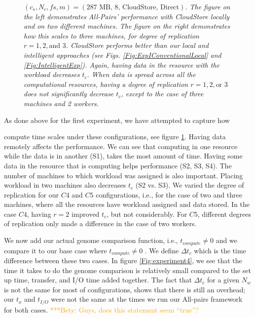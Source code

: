 \documentclass{rspublic}
\newcommand{\micnote}[1]{ {\textcolor{blue} { ***Michael: #1 }}}
\newcommand{\betynote}[1]{ {\textcolor{orange} { ***Bety: #1 }}}
\newcommand{\jhanote}[1]{} \newcommand{\micnote}[1]{}\newcommand{\betynote}[1]{} \newcommand{\fixme}[1]{}
\begin{document}
\begin{figure}
\begin{center}
{\label{Fig:experiment3:b}
}
\caption{\textit{$(c_s, N_c, fs, m) = (\mbox{287 MB, 8, CloudStore,
Direct})$. The figure on the left demonstrates All-Pairs' performance
with CloudStore locally and on two different machines. The figure on the
right demonstrates how this scales to three machines, for degree of
replication $r=1,2,\mbox{and } 3$. CloudStore performs better than our
local and intelligent approaches (see Figs.
\ref{Fig:ExpIConventionalLocal} and \ref{Fig:IntelligentExp}). Again,
having data in the resource with the workload decreases $t_c$. When data
is spread across all the computational resources, having a degree of
replication $r = 1, 2, \mbox{or } 3$ does not significantly decrease
$t_c$, except to the case of three machines and 2 workers.}
\jhanote{This caption needs attention}}
\label{Fig:experiment3}
\end{center}
\end{figure}


As done above for the first experiment, we have attempted to capture how

compute time scales under these configurations, see figure \ref{Fig:experiment3}. Having data remotely affects the performance. We can see that computing in one resource while the data is in another (S1), takes the most amount of time. Having some data in the resource that is computing helps performance (S2, S3, S4). The number of machines to which workload was assigned is also important. Placing workload in two machines also decreases $t_c$ (S2 vs. S3). We varied the degree of replication for our $C4$ and $C5$ configurations, i.e., for the case of two and three machines, where all the resources have workload assigned and data stored. In the case $C4$, having $r = 2$ improved $t_c$, but not considerably. For $C5$, different degrees of replication only made a difference in the case of two workers.

We now add our actual genome comparison function, i.e., $t_{compute} \ne 0$ and we compare it to our base case where $t_{compute} \ne 0$ . We define $\Delta t_c$ which is the time difference between these two cases. In figure \ref{Fig:experiment4}, we see that the time it takes to do the genome comparison is relatively small compared to the set up time, transfer, and I/O time added together. The fact that $\Delta t_c$ for a given $N_w$ is not the same for most of configurations, shows that there is still an overhead; our $t_x$ and $t_{I/O}$ were not the same at the times we run our All-pairs framework for both cases. \betynote{Guys, does this statement seem ``true''?}
\end{document}
